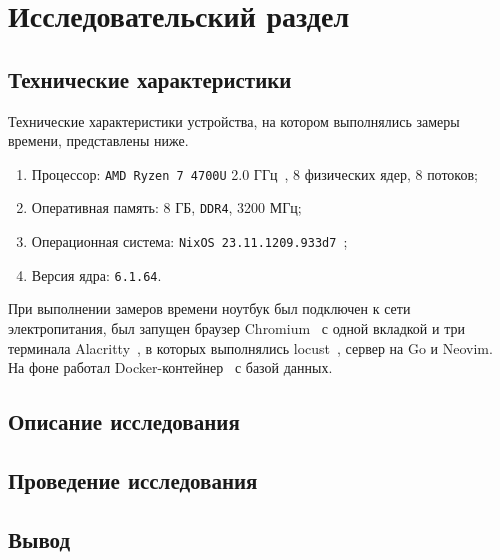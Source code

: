 \section{Исследовательский раздел}

\subsection{Технические характеристики}

Технические характеристики устройства, на котором выполнялись замеры времени, представлены ниже.
\begin{enumerate}
    \item Процессор: \texttt{AMD Ryzen 7 4700U} 2.0 ГГц~\cite{amd}, 8 физических ядер, 8 потоков;
    \item Оперативная память: 8 ГБ, \texttt{DDR4}, 3200 МГц;
    \item Операционная система: \texttt{NixOS 23.11.1209.933d7}~\cite{nixos};
    \item Версия ядра: \texttt{6.1.64}.
\end{enumerate}

При выполнении замеров времени ноутбук был подключен к сети электропитания, был запущен браузер Chromium~\cite{chromium} с одной вкладкой и три терминала Alacritty~\cite{alacritty}, в которых выполнялись locust~\cite{locust}, сервер на Go и Neovim.
На фоне работал Docker-контейнер~\cite{docker} с базой данных.

\subsection{Описание исследования}

\cite{locust}

\subsection{Проведение исследования}

\subsection*{Вывод}
